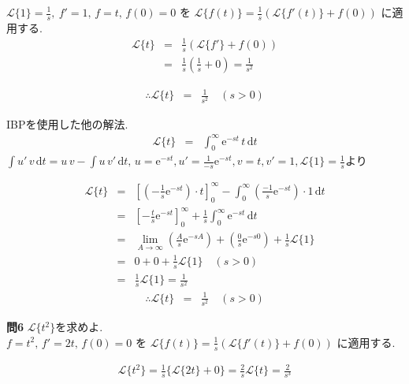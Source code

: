 ﻿\documentclass[a4j]{jarticle}
\begin{document}
\( \mathcal{L} \{ 1 \} = \frac{1}{s} ,\ f'=1 ,\, f=t ,\, f(0)=0 \)
を \( \mathcal{L} \{ f(t) \} = \frac{1}{s} \left( \mathcal{L} \{ f'(t) \} + f(0) \right) \) に適用する.
\begin{eqnarray*}
\mathcal{L} \{ t \} &=& \frac{1}{s} \left( \mathcal{L} \{ f' \} + f(0) \right) \\
                    &=& \frac{1}{s} \left( \frac{1}{s} + 0 \right) = \frac{1}{s^2}
\end{eqnarray*}

\begin{eqnarray*}
\therefore \mathcal{L} \{ t \} &=& \frac{1}{s^2} \quad(s>0)
\end{eqnarray*}

IBPを使用した他の解法.
\begin{eqnarray*}
\mathcal{L} \{ t \} &=& \int_0^\infty{ \mathrm{e}^{-st} \, t \, \mathrm{d}t }
\end{eqnarray*}
 \( \int{ u'\,v } \, \mathrm{d}t = u\,v - \int{ u\,v' } \, \mathrm{d}t ,\, u= \mathrm{e}^{-st}, u'=\frac{1}{-s}\mathrm{e}^{-st}, v=t, v'=1, \mathcal{L} \{ 1 \}=\frac{1}{s} \)より

\begin{eqnarray*}
\mathcal{L} \{ t \} &=& \left[(-\frac{1}{s}\mathrm{e}^{-st})\cdot t\right]_0^\infty - \int_0^\infty{(\frac{-1}{s}\mathrm{e}^{-st} )\cdot1 \, \mathrm{d}t } \\
                    &=& \left[-\frac{t}{s}\mathrm{e}^{-st}\right]_0^\infty + \frac{1}{s}\int_0^\infty{ \mathrm{e}^{-st}\, \mathrm{d}t } \\
                    &=& \lim_{A\to\infty}(\frac{A}{s} \mathrm{e}^{-sA}) + (\frac{0}{s}\mathrm{e}^{-s0}) + \frac{1}{s}\mathcal{L} \{ 1 \} \\
                    &=& 0 + 0 + \frac{1}{s} \mathcal{L} \{ 1 \} \quad(s>0) \\
                    &=& \frac{1}{s}\mathcal{L} \{ 1 \} = \frac{1}{s^2}
\end{eqnarray*}
\begin{eqnarray*}
\therefore \mathcal{L} \{ t \} &=& \frac{1}{s^2} \quad(s>0)
\end{eqnarray*}

\noindent
\large{\bf{問6}}\/ \( \mathcal{L} \{ t^2 \} \)を求めよ. \\

\( f=t^2 ,\, f'=2t ,\, f(0) = 0 \) を \( \mathcal{L} \{ f(t) \} = \frac{1}{s} \left( \mathcal{L} \{ f'(t) \} + f(0) \right) \) に適用する.

\begin{eqnarray*}
\mathcal{L} \{ t^2 \} = \frac{1}{s} \{ \mathcal{L} \{ 2t \} + 0 \} = \frac{2}{s} \mathcal{L} \{ t \} = \frac{2}{s^3}
\end{eqnarray*}
\end{document}
